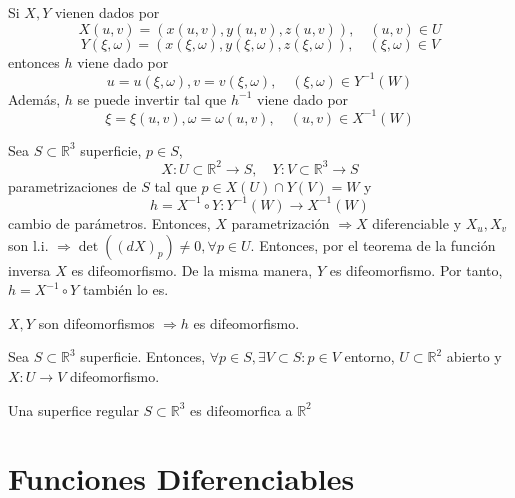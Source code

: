 \begin{obs}
  Si $X, Y$ vienen dados por
  \[ 
    X(u, v) = (x(u, v), y(u, v), z(u, v)), \quad (u,v)\in U
  \] 
    \[ 
    Y(\xi, \omega ) = (x(\xi, \omega ), y(\xi, \omega ), z(\xi, \omega )), \quad (\xi, \omega ) \in V
  \] 
  entonces $h$ viene dado por
  \[ 
    u = u(\xi, \omega), v=v(\xi, \omega), \quad (\xi, \omega ) \in Y^{-1}(W) 
  \] 
  Además, $h$ se puede invertir tal que $h^{-1}$ viene dado por
  \[ 
    \xi = \xi(u,v), \omega = \omega(u,v), \quad (u,v) \in X^{-1}(W)
  \] 
\end{obs}

\begin{dem}
  Sea $S \subset \mathbb{R}^{3}$ superficie, $p \in S$,
  \[
    X : U \subset \mathbb{R}^{2} \to S, \quad Y : V \subset \mathbb{R}^{3} \to S
  \]
  parametrizaciones de $S$ tal que $p \in X(U)\cap Y(V) = W$ y
  \[
    h = X^{-1} \circ Y : Y^{-1}(W) \to X^{-1}(W)
  \]
  cambio de parámetros. Entonces, $X$ parametrización $\Rightarrow X$ diferenciable y $X_{u}, X_{v}$ son l.i. $\Rightarrow \det((d X)_{p}) \neq 0, \forall p \in U$. Entonces, por el teorema de la función inversa $X$ es difeomorfismo. De la misma manera, $Y$ es difeomorfismo. Por tanto, $h = X^{-1} \circ Y$ también lo es.
\end{dem}

\begin{obs}
  $X, Y$ son difeomorfismos $\Rightarrow h$ es difeomorfismo.
\end{obs}

\begin{defn}
  Sea $S \subset \mathbb{R}^{3}$ superficie. Entonces, $ \forall p \in S, \exists V \subset S :  p \in V$ entorno, $U \subset \mathbb{R}^{2}$ abierto y $X : U \to V$ difeomorfismo.
\end{defn}

\begin{obs}
  Una superfice regular $S \subset \mathbb{R}^{3}$ es difeomorfica a $\mathbb{R}^{2}$
\end{obs}

%

\section{Funciones Diferenciables}

